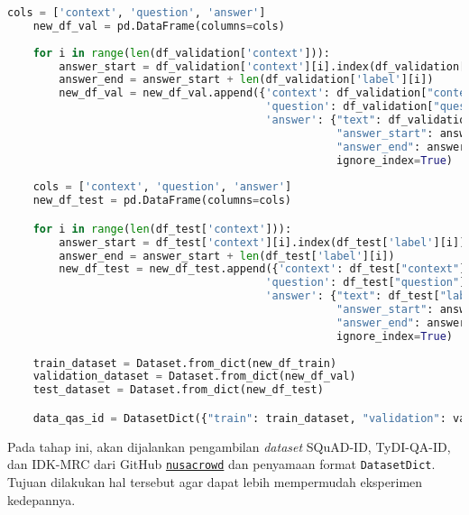 \begin{lstlisting}[language=Python, caption=Mengimpor \emph{dataset} sistem tanya jawab]
    cols = ['context', 'question', 'answer']
    new_df_val = pd.DataFrame(columns=cols)    
        
    for i in range(len(df_validation['context'])):
        answer_start = df_validation['context'][i].index(df_validation['label'][i])
        answer_end = answer_start + len(df_validation['label'][i])
        new_df_val = new_df_val.append({'context': df_validation["context"][i], 
                                        'question': df_validation["question"][i], 
                                        'answer': {"text": df_validation["label"][i], 
                                                   "answer_start": answer_start, 
                                                   "answer_end": answer_end}}, 
                                                   ignore_index=True)    
        
    cols = ['context', 'question', 'answer']
    new_df_test = pd.DataFrame(columns=cols)

    for i in range(len(df_test['context'])):
        answer_start = df_test['context'][i].index(df_test['label'][i])
        answer_end = answer_start + len(df_test['label'][i])
        new_df_test = new_df_test.append({'context': df_test["context"][i], 
                                        'question': df_test["question"][i], 
                                        'answer': {"text": df_test["label"][i], 
                                                   "answer_start": answer_start, 
                                                   "answer_end": answer_end}}, 
                                                   ignore_index=True)
    
    train_dataset = Dataset.from_dict(new_df_train)
    validation_dataset = Dataset.from_dict(new_df_val)
    test_dataset = Dataset.from_dict(new_df_test)

    data_qas_id = DatasetDict({"train": train_dataset, "validation": validation_dataset, "test": test_dataset})
\end{lstlisting}

Pada tahap ini, akan dijalankan pengambilan \emph{dataset} SQuAD-ID, TyDI-QA-ID, dan IDK-MRC dari GitHub \href{https://github.com/IndoNLP/nusa-crowd/tree/master/nusacrowd/nusa_datasets/}{\texttt{nusacrowd}} dan penyamaan format \texttt{DatasetDict}. Tujuan dilakukan hal tersebut agar dapat lebih mempermudah eksperimen kedepannya.

